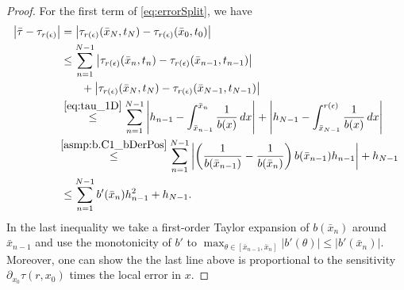 \documentclass[a4paper, oneside, reqno]{amsart}
\newcommand{\abs}[1]{\left\lvert#1\right\rvert}
\theoremstyle{remark}
\begin{document}
\begin{proof}
    For the first term of \eqref{eq:errorSplit}, we have
    \begingroup 
    \allowdisplaybreaks
    \begin{align}
    \label{eq:secondTermExp}
        \abs{\bar\tau-\tau_{r(\epsilon)}} &= \abs{\tau_{r(\epsilon)}(\bar{x}_N, t_N)-\tau_{r(\epsilon)}(\bar{x}_0, t_0)}\nonumber\\
        & \leq \sum_{n=1}^{N-1}\abs{\tau_{r(\epsilon)}(\bar{x}_n, t_n) - \tau_{r(\epsilon)}(\bar{x}_{n-1}, t_{n-1})} \nonumber \\
        &\hspace{6.5mm} + \abs{\tau_{r(\epsilon)}(\bar{x}_N, t_N) - \tau_{r(\epsilon)}(\bar{x}_{N-1}, t_{N-1})} \nonumber\\
        &\stackrel{\eqref{eq:tau_1D}}{\leq} \sum_{n=1}^{N-1}\abs{h_{n-1} - \int_{\bar x_{n-1}}^{\bar x_n}\frac{1}{b(x)}\, dx} + \abs{h_{N-1} - \int_{\bar x_{N-1}}^{r(\epsilon)}\frac{1}{b(x)}\, dx} \nonumber \\
        &\hspace{-1mm}\stackrel{\eqref{asmp:b.C1_bDerPos}}{\leq} \sum_{n=1}^{N-1}\abs{\left(\frac{1}{b(\bar x_{n-1})}-\frac{1}{b(\bar x_{n})}\right)b(\bar x_{n-1})h_{n-1}} + h_{N-1} \nonumber \\
        &\leq \sum_{n=1}^{N-1} b'(\bar x_n)h_{n-1}^2 + h_{N-1}.
    \end{align}
    \endgroup
    In the last inequality we take a first-order Taylor expansion of \(b(\bar x_n)\) around \(\bar x_{n-1}\) and use the monotonicity of $b'$ to $\max_{\theta \in [\bar x_{n-1}, \bar x_n]} |b'(\theta)| \le |b'(\bar x_n)|$.
    Moreover, one can show the the last line above is proportional to the sensitivity \(\partial_{x_0} \tau(r, x_0)\) times the local error in \(x\).
    

\end{proof}
\end{document}
